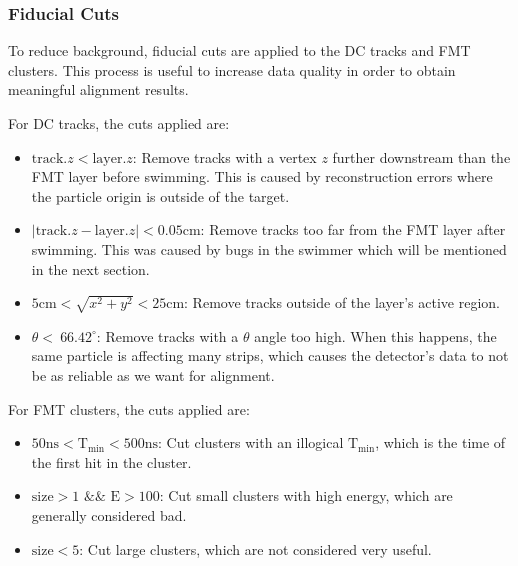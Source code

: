 \subsubsection{Fiducial Cuts}
    To reduce background, fiducial cuts are applied to the DC tracks and FMT clusters.
    This process is useful to increase data quality in order to obtain meaningful alignment results.

    For DC tracks, the cuts applied are:
    \begin{itemize}
        \item $\text{track}.z < \text{layer}.z$:
        Remove tracks with a vertex $z$ further downstream than the FMT layer before swimming.
        This is caused by reconstruction errors where the particle origin is outside of the target.
        \item $\mid\text{track}.z - \text{layer}.z\mid < 0.05 \text{cm}$:
        Remove tracks too far from the FMT layer after swimming.
        This was caused by bugs in the swimmer which will be mentioned in the next section.
        \item $5 \text{cm} < \sqrt{x^2 + y^2} < 25 \text{cm}$:
        Remove tracks outside of the layer's active region.
        \item $\theta < ~66.42^{\circ}$:
        Remove tracks with a $\theta$ angle too high.
        When this happens, the same particle is affecting many strips, which causes the detector's data to not be as reliable as we want for alignment.
    \end{itemize}

    For FMT clusters, the cuts applied are:
    \begin{itemize}
        \item $50 \text{ns} < \text{T}_{\text{min}} < 500 \text{ns}$:
        Cut clusters with an illogical $\text{T}_{\text{min}}$, which is the time of the first hit in the cluster.
        \item $\text{size} > 1$ $\&\&$ $\text{E} > 100$:
        Cut small clusters with high energy, which are generally considered bad.
        \item $\text{size} < 5$:
        Cut large clusters, which are not considered very useful.
    \end{itemize}

